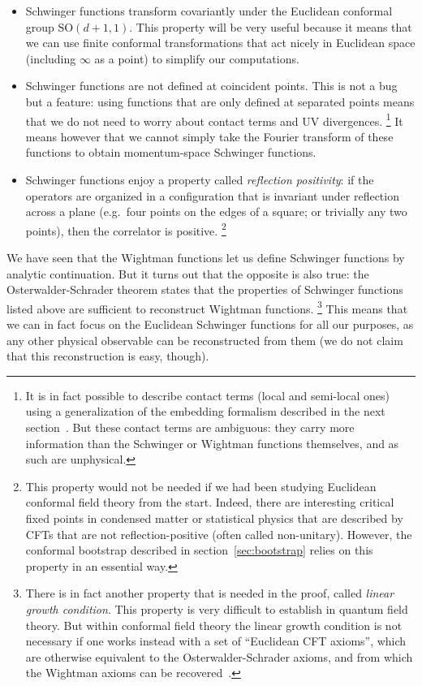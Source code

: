 \documentclass[a4paper,12pt]{article}
\newcommand{\SO}{\text{SO}}
\numberwithin{equation}{section}
\begin{document}
\begin{itemize}

\item
Schwinger functions transform covariantly under the Euclidean conformal group $\SO(d+1, 1)$. This property will be very useful because it means that we can use finite conformal transformations that act nicely in Euclidean space (including $\infty$ as a point) to simplify our computations.

\item
Schwinger functions are not defined at coincident points. This is not a bug but a feature: using functions that are only defined at separated points means that we do not need to worry about contact terms and UV divergences.%
%
\footnote{It is in fact possible to describe contact terms (local and semi-local ones) using a generalization of the embedding formalism described in the next section~\cite{Nakayama:2019mpz}. But these contact terms are ambiguous: they carry more information than the Schwinger or Wightman functions themselves, and as such are unphysical.}
%
It means however that we cannot simply take the Fourier transform of these functions to obtain momentum-space Schwinger functions. 

\item
Schwinger functions enjoy a property called \emph{reflection positivity}: if the operators are organized in a configuration that is invariant under reflection across a plane (e.g.~four points on the edges of a square; or trivially any two points), then the correlator is positive.%
%
\footnote{This property would not be needed if we had been studying Euclidean conformal field theory from the start. Indeed, there are interesting critical fixed points in condensed matter or statistical physics that are described by CFTs that are not reflection-positive (often called non-unitary).
However, the conformal bootstrap described in section~\ref{sec:bootstrap} relies on this property in an essential way.}
%

\end{itemize}

We have seen that the Wightman functions let us define Schwinger functions by analytic continuation. But it turns out that the opposite is also true: the Osterwalder-Schrader theorem states that the properties of Schwinger functions listed above are sufficient to reconstruct Wightman functions.%
%
\footnote{There is in fact another property that is needed in the proof, called \emph{linear growth condition}. This property is very difficult to establish in quantum field theory. But within conformal field theory the linear growth condition is not necessary if one works instead with a set of ``Euclidean CFT axioms'', which are otherwise equivalent to the Osterwalder-Schrader axioms, and from which the Wightman axioms can be recovered~\cite{Kravchuk:2020scc, Kravchuk:2021kwe}.}
%
This means that we can in fact focus on the Euclidean Schwinger functions for all our purposes, as any other physical observable can be reconstructed from them (we do not claim that this reconstruction is easy, though).
\end{document}
